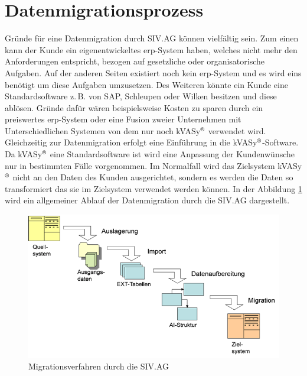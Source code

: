 \section{Datenmigrationsprozess}
Gründe für eine Datenmigration durch SIV.AG können vielfältig sein. Zum einen kann der Kunde ein eigenentwickeltes \acrshort{erp}-System haben, welches nicht mehr den Anforderungen entspricht, bezogen auf gesetzliche oder organisatorische Aufgaben. Auf der anderen Seiten existiert noch kein \acrshort{erp}-System und es wird eins benötigt um diese Aufgaben umzusetzen. Des Weiteren könnte ein Kunde eine Standardsoftware z.\,B. von SAP, Schleupen oder Wilken besitzen und diese ablösen. Gründe dafür wären beispielsweise Kosten zu sparen durch ein preiswertes \acrshort{erp}-System oder eine Fusion zweier Unternehmen mit Unterschiedlichen Systemen von dem nur noch kVASy$^\text{\textregistered}$ verwendet wird. Gleichzeitig zur Datenmigration erfolgt eine Einführung in die kVASy$^\text{\textregistered}$-Software. Da kVASy$^\text{\textregistered}$ eine Standardsoftware ist wird eine Anpassung der Kundenwünsche nur in bestimmten Fälle vorgenommen. Im Normalfall wird das Zielsystem kVASy$^\text{\textregistered}$ nicht an den Daten des Kunden ausgerichtet, sondern es werden die Daten so transformiert das sie im Zielsystem verwendet werden können.
In der Abbildung \ref{pic:mig:end} wird ein allgemeiner Ablauf der Datenmigration durch die SIV.AG dargestellt.
\begin{figure}[ht]
	\begin{center}
		\includegraphics[scale=0.6]{bilder/migrationsverfahren.png}
		\caption{Migrationsverfahren durch die SIV.AG}
		\label{pic:mig:end}
	\end{center}
\end{figure}

